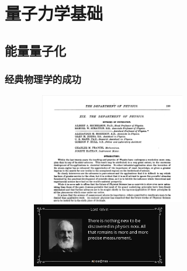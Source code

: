 \section{量子力学基础}
\subsection{能量量子化}
\frame
{
	\frametitle{经典物理学的成功}
\begin{figure}[h!]
\vspace*{-0.18in}
\centering
\includegraphics[height=1.90in,width=3.00in,viewport=0 0 1150 690,clip]{Figures/Albert_Michelson-Quotes.jpg}
\includegraphics[height=1.10in,width=2.55in,viewport=0 0 880 400,clip]{Figures/Quote-there-is-nothing-new-to-be-discovered-in-physics-now-all-that-remains-is-more-and-more-lord-kelvin-57-38-79.jpg}
\label{two_Dark_Clouds}
\end{figure}
}

